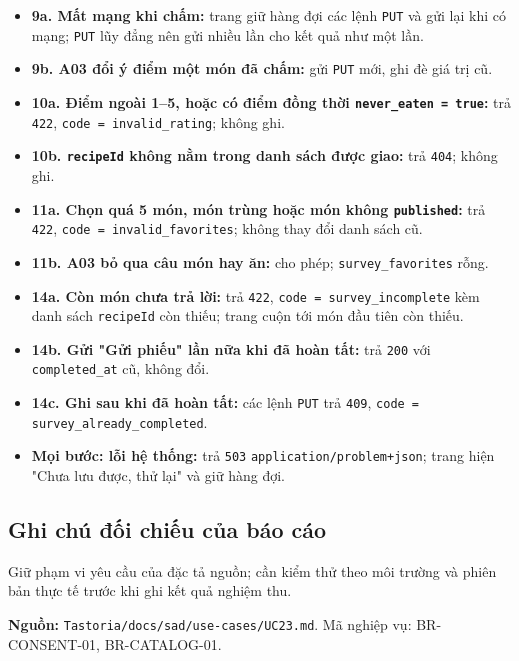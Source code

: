 \begin{itemize}
\item \textbf{9a. Mất mạng khi chấm:} trang giữ hàng đợi các lệnh {\small\texttt{PUT}} và gửi lại khi có mạng; {\small\texttt{PUT}} lũy đẳng nên gửi nhiều lần cho kết quả như một lần.
\item \textbf{9b. A03 đổi ý điểm một món đã chấm:} gửi {\small\texttt{PUT}} mới, ghi đè giá trị cũ.
\item \textbf{10a. Điểm ngoài 1--5, hoặc có điểm đồng thời {\small\texttt{never\_\allowbreak{}\allowbreak{}eaten = true}}:} trả {\small\texttt{422}}, {\small\texttt{code = invalid\_\allowbreak{}\allowbreak{}rating}}; không ghi.
\item \textbf{10b. {\small\texttt{recipeId}} không nằm trong danh sách được giao:} trả {\small\texttt{404}}; không ghi.
\item \textbf{11a. Chọn quá 5 món, món trùng hoặc món không {\small\texttt{published}}:} trả {\small\texttt{422}}, {\small\texttt{code = invalid\_\allowbreak{}\allowbreak{}favorites}}; không thay đổi danh sách cũ.
\item \textbf{11b. A03 bỏ qua câu món hay ăn:} cho phép; {\small\texttt{survey\_\allowbreak{}\allowbreak{}favorites}} rỗng.
\item \textbf{14a. Còn món chưa trả lời:} trả {\small\texttt{422}}, {\small\texttt{code = survey\_\allowbreak{}\allowbreak{}incomplete}} kèm danh sách {\small\texttt{recipeId}} còn thiếu; trang cuộn tới món đầu tiên còn thiếu.
\item \textbf{14b. Gửi "Gửi phiếu" lần nữa khi đã hoàn tất:} trả {\small\texttt{200}} với {\small\texttt{completed\_\allowbreak{}\allowbreak{}at}} cũ, không đổi.
\item \textbf{14c. Ghi sau khi đã hoàn tất:} các lệnh {\small\texttt{PUT}} trả {\small\texttt{409}}, {\small\texttt{code = survey\_\allowbreak{}\allowbreak{}already\_\allowbreak{}\allowbreak{}completed}}.
\item \textbf{Mọi bước: lỗi hệ thống:} trả {\small\texttt{503}} {\small\texttt{application/\allowbreak{}\allowbreak{}problem+json}}; trang hiện "Chưa lưu được, thử lại" và giữ hàng đợi.
\end{itemize}
\subsection{Ghi chú đối chiếu của báo cáo}
Giữ phạm vi yêu cầu của đặc tả nguồn; cần kiểm thử theo môi trường và phiên bản thực tế trước khi ghi kết quả nghiệm thu.

\textbf{Nguồn:} {\small\texttt{Tastoria/\allowbreak{}\allowbreak{}docs/\allowbreak{}\allowbreak{}sad/\allowbreak{}\allowbreak{}use-\allowbreak{}cases/\allowbreak{}\allowbreak{}UC23.\allowbreak{}md}}. Mã nghiệp vụ: BR-\allowbreak{}CONSENT-\allowbreak{}01, BR-\allowbreak{}CATALOG-\allowbreak{}01.

